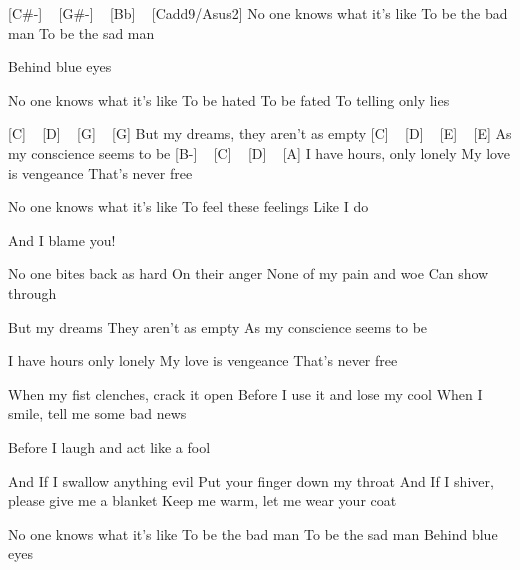 [C#-] ~ [G#-] ~ [Bb] ~ [Cadd9/Asus2]
No one knows what it's like
To be the bad man
To be the sad man

Behind blue eyes

No one knows what it's like
To be hated
To be fated
To telling only lies

[C] ~ [D] ~ [G] ~ [G]
But my dreams, they aren't as empty
[C] ~ [D] ~ [E] ~ [E]
As my conscience seems to be
[B-] ~ [C] ~ [D] ~ [A]
I have hours, only lonely
My love is vengeance
That's never free

No one knows what it's like
To feel these feelings
Like I do

And I blame you!

No one bites back as hard
On their anger
None of my pain and woe
Can show through

But my dreams
They aren't as empty
As my conscience seems to be

I have hours only lonely
My love is vengeance
That's never free

When my fist clenches, crack it open
Before I use it and lose my cool
When I smile, tell me some bad news

Before I laugh and act like a fool

And If I swallow anything evil
Put your finger down my throat
And If I shiver, please give me a blanket
Keep me warm, let me wear your coat

No one knows what it's like
To be the bad man
To be the sad man
Behind blue eyes
